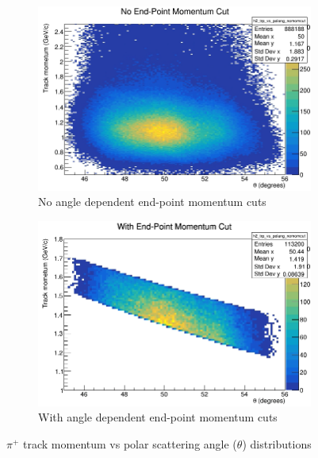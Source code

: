 \begin{figure}
   \begin{subfigure}{1\textwidth}
        \centering
        \includegraphics[scale=0.75]{Images/sbs9_hydrogen_analysis/trackP_vs_theta_NoEndPointCut.png}
        \caption{No angle dependent end-point momentum cuts}
        \label{fig:trp_vs_theta_NoEndPointCuts}
   \end{subfigure}
    \hfill
   \begin{subfigure}{1\textwidth}
        \centering
        \includegraphics[scale=0.75]{Images/sbs9_hydrogen_analysis/trackP_vs_theta_WithEndPointCut.png}
        \caption{With angle dependent end-point momentum cuts}
        \label{fig:trp_vs_theta_WithEndPointCuts}
   \end{subfigure}
   \caption{$\pi^+$ track momentum vs polar scattering angle ($\theta$) distributions}
   \label{fig:TrackP_vs_theta_distribution}
\end{figure}

